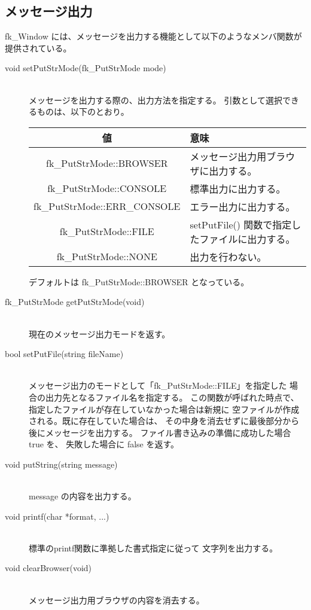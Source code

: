 \subsection{メッセージ出力} \label{subsec:winmessage}
fk\_Window には、メッセージを出力する機能として以下のようなメンバ関数が
提供されている。
\begin{description}
 \item[void setPutStrMode(fk\_PutStrMode mode)] ~ \\
	メッセージを出力する際の、出力方法を指定する。
	引数として選択できるものは、以下のとおり。
	\begin{center}
	\begin{tabular}{|c|l|}
	\hline
	値 & 意味 \\ \hline
	fk\_PutStrMode::BROWSER & メッセージ出力用ブラウザに出力する。\\ \hline
	fk\_PutStrMode::CONSOLE & 標準出力に出力する。\\ \hline
	fk\_PutStrMode::ERR\_CONSOLE & エラー出力に出力する。\\ \hline
	fk\_PutStrMode::FILE & setPutFile() 関数で指定したファイルに出力する。\\ \hline
	fk\_PutStrMode::NONE & 出力を行わない。\\ \hline
	\end{tabular}
	\end{center}
	デフォルトは fk\_PutStrMode::BROWSER となっている。\\

\item[fk\_PutStrMode getPutStrMode(void)] ~ \\
	現在のメッセージ出力モードを返す。\\

\item[bool setPutFile(string fileName)] ~ \\
	メッセージ出力のモードとして「fk\_PutStrMode::FILE」を指定した
	場合の出力先となるファイル名を指定する。
	この関数が呼ばれた時点で、
	指定したファイルが存在していなかった場合は新規に
	空ファイルが作成される。既に存在していた場合は、
	その中身を消去せずに最後部分から後にメッセージを出力する。
	ファイル書き込みの準備に成功した場合 true を、
	失敗した場合に false を返す。\\

\item[void putString(string message)] ~ \\
	message の内容を出力する。\\

\item[void printf(char *format, ...)] ~ \\
	標準のprintf関数に準拠した書式指定に従って
	文字列を出力する。\\

\item[void clearBrowser(void)] ~ \\
	メッセージ出力用ブラウザの内容を消去する。
\end{description}

